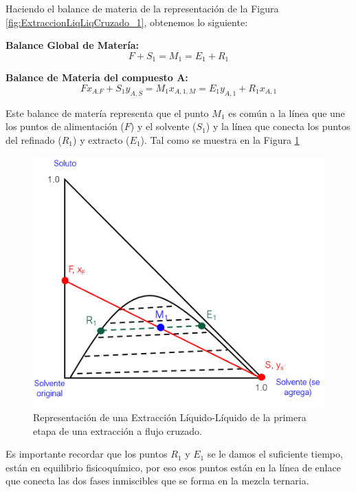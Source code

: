 \documentclass[11pt]{book}
\begin{document}
Haciendo el balance de materia de la representación de la Figura \ref{fig:ExtraccionLiqLiqCruzado_1}, obtenemos lo siguiente:

\textbf{Balance Global de Matería:}
\begin{equation}
    \label{eq:ExtraccionLiqLiqCruzado_1}
    F + S_1 = M_1 = E_1 + R_1
\end{equation}

\textbf{Balance de Materia del compuesto A:}
\begin{equation}
    \label{eq:ExtraccionLiqLiqCruzado_2}
    F x_{A.F} + S_1 y_{A,S} = M_1 x_{A,1,M} = E_1 y_{A,1} + R_1 x_{A,1}
\end{equation}

Este balance de matería representa que el punto $M_1$ es común a la línea que une los puntos de alimentación ($F$) y el solvente ($S_1$) y la línea que conecta los puntos del refinado ($R_1$) y extracto ($E_1$). Tal como se muestra en la Figura \ref{fig:ExtraccionLiqLiqCruzado_2}

\begin{figure}
    \centering
    \includegraphics{img/LiquidoLiquido/ExtracionLiqLiqCruzado_2.PNG}
    \caption{Representación de una Extracción Líquido-Líquido de la primera etapa de una extracción a flujo cruzado.}
    \label{fig:ExtraccionLiqLiqCruzado_2}
\end{figure}

Es importante recordar que los puntos $R_1$ y $E_1$ se le damos el suficiente tiempo, están en equilibrio fisicoquímico, por eso esos puntos están en la línea de enlace que conecta las dos fases inmiscibles que se forma en la mezcla ternaria.
\end{document}
